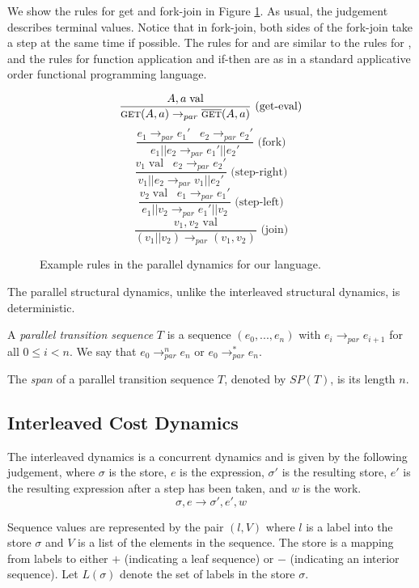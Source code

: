 We show the rules for get and fork-join in Figure \ref{fig:parallel-dynamics}. As usual, the judgement  describes terminal values. Notice that in fork-join, both sides of the fork-join take a step at the same time if possible. The rules for \set{} and \new{} are similar to the rules for \get{}, and the rules for function application and if-then are as in a standard applicative order functional programming language. 

\begin{figure}
$$\frac{A, a \; \text{val}}{\text{{\sc get}}{}(A, a) \to_{par} \overline{\mbox{{\sc get}{}}}(A, a)} \text{ (get-eval)}$$
$$\frac{e_1 \to_{par} e_1' \;\;\; e_2 \to_{par} e_2'}{e_1 || e_2 \to_{par} e_1' || e_2'} \text{ (fork)}$$
$$\frac{v_1 \; \text{val} \;\;\; e_2 \to_{par} e_2'}{v_1 || e_2 \to_{par} v_1 || e_2'} \text{ (step-right)}$$
$$\frac{v_2 \; \text{val} \;\;\; e_1 \to_{par} e_1'}{e_1 || v_2 \to_{par} e_1' || v_2} \text{ (step-left)}$$
$$\frac{v_1, v_2 \text{ val}}{(v_1 || v_2) \to_{par} (v_1, v_2)} \text{ (join)}$$

\caption{Example rules in the parallel dynamics for our language.}
\label{fig:parallel-dynamics}
\end{figure}

The parallel structural dynamics, unlike the interleaved
structural dynamics, is deterministic.

\begin{definition}
A \emph{parallel transition sequence} $T$ is a sequence $(e_0, ..., e_n)$ with $e_i \to_{par} e_{i+1}$ for all $0 \leq i < n$. We say that $e_0 \to^n_{par} e_n$ or $e_0 \to^*_{par} e_n$.
\end{definition}

\begin{definition}
The \emph{span} of a parallel transition sequence $T$, denoted by $SP(T)$, is its length $n$.
\end{definition}

\subsection{Interleaved Cost Dynamics}

The interleaved dynamics is a concurrent dynamics and is given by the following judgement, where $\sigma$ is the
store, $e$ is the expression, $\sigma'$ is the resulting store, $e'$ is the
resulting expression after a step has been taken, and $w$ is the work.
$$\sigma, e \to \sigma', e', w$$

Sequence values are represented by the pair $(l, V)$ where $l$ is a
label into the store $\sigma$ and $V$ is a list of the elements in the sequence.  The store is a mapping from labels to either $+$ (indicating a leaf sequence)
or $-$ (indicating an interior sequence). Let $L(\sigma)$ denote the set of labels in the store $\sigma$.

